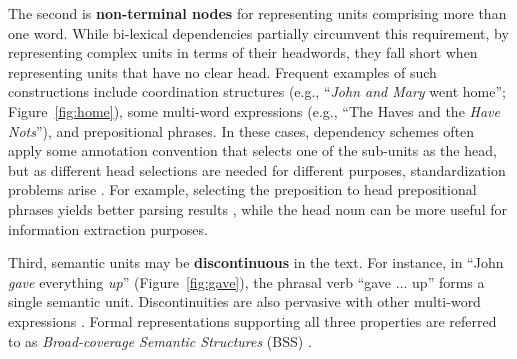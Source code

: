 \documentclass[11pt]{article}
\newcommand{\figref}[1]{Figure~\ref{#1}}
\begin{document}
The second is \textbf{non-terminal nodes} for representing units
comprising more than one word.
While bi-lexical dependencies partially circumvent this requirement, by
representing complex units in terms of their headwords, they fall short
when representing units that have no clear head.
Frequent examples of such constructions include
coordination structures (e.g., ``\textit{John and Mary} went home''; \figref{fig:home}),
some multi-word expressions (e.g., ``The Haves and the \textit{Have Nots}''),
and prepositional phrases.
In these cases, dependency schemes often apply some annotation convention that
selects one of the sub-units
as the head, but as different head selections are needed for different purposes,
standardization problems arise \cite{Ivanova2012who}.
For example, selecting the preposition to head prepositional phrases yields better
parsing results \cite{Schwartz:12}, while the head noun can be more useful for
information extraction purposes.

Third, semantic units may be \textbf{discontinuous} in the text. For instance, in
``John \textit{gave} everything \textit{up}''
(\figref{fig:gave}), the phrasal verb ``gave ... up'' forms a single semantic unit.
Discontinuities are also pervasive with other multi-word
expressions \cite{schneider2014discriminative}.
Formal representations supporting all three properties are referred to as
{\it Broad-coverage Semantic Structures} (BSS) \cite{hershcovich2016broad}.
\end{document}
